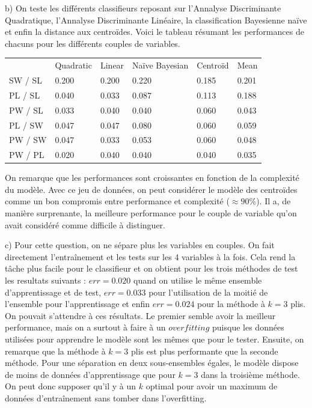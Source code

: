 \documentclass{article}
\begin{document}
b) On teste les différents classifieurs reposant sur l'Annalyse Discriminante Quadratique, l'Annalyse Discriminante Linéaire, la classification Bayesienne naïve et enfin la distance aux centroïdes.
Voici le tableau résumant les performances de chacuns pour les différents couples de variables. \\
\begin{table}[h!]
\begin{tabular}{@{}llllll@{}}

        & Quadratic & Linear & Naïve Bayesian & Centroïd & Mean \\ 
SW / SL & 0.200     & 0.200  & 0.220          & 0.185    &      0.201 \\
PL / SL & 0.040     & 0.033  & 0.087          & 0.113    &      0.188\\
PW / SL & 0.033     & 0.040  & 0.040          & 0.060    &      0.043\\
PL / SW & 0.047     & 0.047  & 0.080          & 0.060    &      0.059\\
PW / SW & 0.047     & 0.033  & 0.053          & 0.060    &      0.048\\
PW / PL & 0.020     & 0.040  & 0.040          & 0.040    &      0.035
\end{tabular}
\end{table}

On remarque que les performances sont croissantes en fonction de la complexité du modèle. Avec ce jeu de données, on peut considérer le modèle des centroïdes comme un bon compromis entre performance et complexité ($\approx 90$\%). Il a, de manière surprenante, la meilleure performance pour le couple de variable qu'on avait considéré comme difficile à distinguer.

c) Pour cette question, on ne sépare plus les variables en couples. On fait directement l'entraînement et les tests sur les 4 variables à la fois. Cela rend la tâche plus facile pour le classifieur et on obtient pour les trois méthodes de test les resultats suivants : $err = 0.020$ quand on utilise le même ensemble d'apprentissage et de test, $err = 0.033$ pour l'utilisation de la moitié de l'ensemble pour l'apprentissage et enfin $err = 0.024$ pour la méthode à $k = 3$ plis.
On pouvait s'attendre à ces résultats. Le premier semble avoir la meilleur performance, mais on a surtout à faire à un $overfitting$ puisque les données utilisées pour apprendre le modèle sont les mêmes que pour le tester. Ensuite, on remarque que la méthode à $k = 3$ plis est plus performante que la seconde méthode. Pour une séparation en deux sous-ensembles égales, le modèle dispose de moins de données d'apprentissage que pour $k = 3$ dans la troisième méthode. On peut donc supposer qu'il y à un $k$ optimal pour avoir un maximum de données d'entraînement sans tomber dans l'overfitting.
\end{document}

